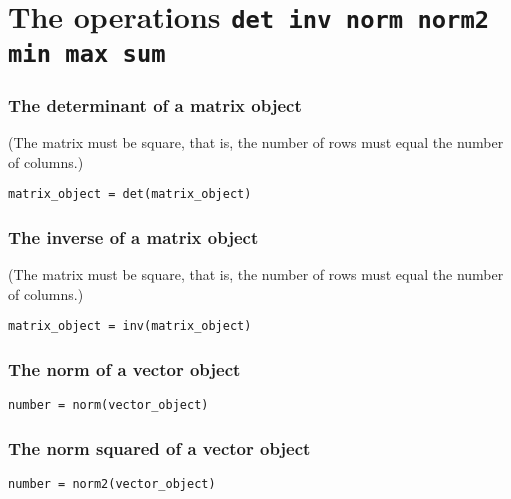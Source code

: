 \section{The operations \texttt{det inv norm norm2 min max sum}}


\subsubsection{The determinant of a matrix object} 

(The matrix must be square, that is, the number of rows must equal the number of columns.)
\begin{lstlisting}
matrix_object = det(matrix_object)
\end{lstlisting}


\subsubsection{The inverse of a matrix object} 
 

(The matrix must be square, that is, the number of rows must equal the number of columns.)
\begin{lstlisting}
matrix_object = inv(matrix_object)
\end{lstlisting}


\subsubsection{The norm of a vector object}

\begin{lstlisting}
number = norm(vector_object)
\end{lstlisting}
\bigskip %


\subsubsection{The norm squared of a vector object}

\begin{lstlisting}
number = norm2(vector_object)
\end{lstlisting}
\bigskip 


